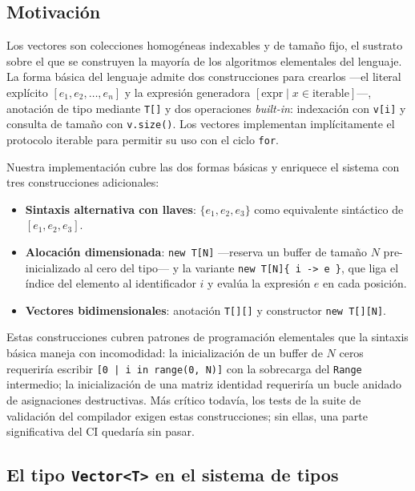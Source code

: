 \documentclass[11pt,a4paper,oneside,openany]{report}
\newcommand{\code}[1]{\texttt{#1}}
\begin{document}
\subsection{Motivación}

Los vectores son colecciones homogéneas indexables y de tamaño fijo, el
sustrato sobre el que se construyen la mayoría de los algoritmos
elementales del lenguaje. La forma básica del lenguaje admite dos
construcciones para crearlos ---el literal explícito $[e_1, e_2, \ldots,
e_n]$ y la expresión generadora $[\text{expr} \mid x \in
\text{iterable}]$---, anotación de tipo mediante \code{T[]} y dos
operaciones \emph{built-in}: indexación con \code{v[i]} y consulta de
tamaño con \code{v.size()}. Los vectores implementan implícitamente el
protocolo iterable para permitir su uso con el ciclo \code{for}.

Nuestra implementación cubre las dos formas básicas y enriquece el sistema
con tres construcciones adicionales:

\begin{itemize}
  \item \textbf{Sintaxis alternativa con llaves}: $\{e_1, e_2, e_3\}$ como
    equivalente sintáctico de $[e_1, e_2, e_3]$.
  \item \textbf{Alocación dimensionada}: \code{new T[N]} ---reserva un
    buffer de tamaño $N$ pre-inicializado al cero del tipo--- y la
    variante \code{new T[N]\{ i -> e \}}, que liga el índice del elemento
    al identificador $i$ y evalúa la expresión $e$ en cada posición.
  \item \textbf{Vectores bidimensionales}: anotación \code{T[][]} y
    constructor \code{new T[][N]}.
\end{itemize}

Estas construcciones cubren patrones de programación elementales que la
sintaxis básica maneja con incomodidad: la inicialización de un buffer de
$N$ ceros requeriría escribir \code{[0 | i in range(0, N)]} con la
sobrecarga del \code{Range} intermedio; la inicialización de una matriz
identidad requeriría un bucle anidado de asignaciones destructivas. Más
crítico todavía, los tests de la suite de validación del compilador exigen
estas construcciones; sin ellas, una parte significativa del CI quedaría
sin pasar.

\subsection{El tipo \code{Vector<T>} en el sistema de tipos}
\end{document}
